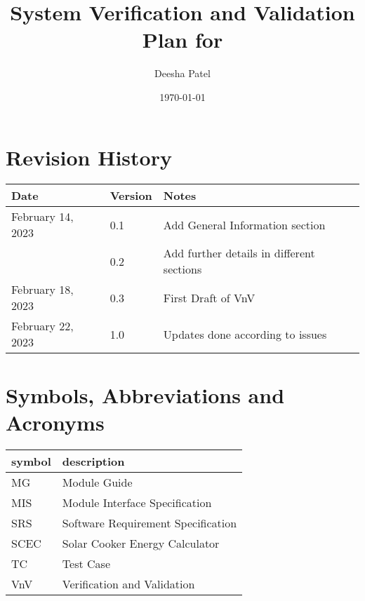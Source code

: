 \documentclass[12pt, titlepage]{article}
\begin{document}
\title{System Verification and Validation Plan for } 
\author{Deesha Patel}
\date{\today}
	
\maketitle


\section{Revision History}

\begin{tabularx}{\textwidth}{p{5cm}p{1.5cm}X}
\toprule {\bf Date} & {\bf Version} & {\bf Notes}\\
\midrule
February 14, 2023 & 0.1 & Add General Information section \\
& 0.2 & Add further details in different sections \\

February 18, 2023 & 0.3 & First Draft of VnV \\
February 22, 2023 & 1.0 & Updates done according to issues \\
\bottomrule
\end{tabularx}

\newpage

\tableofcontents

\listoftables


\newpage

\section{Symbols, Abbreviations and Acronyms}

\renewcommand{\arraystretch}{1.2}
\begin{tabular}{l l} 
  \toprule		
  \textbf{symbol} & \textbf{description}\\
  \midrule 
  MG & Module Guide \\
  MIS & Module Interface Specification \\
  SRS & Software Requirement Specification\\
  SCEC & Solar Cooker Energy Calculator \\ 
  TC & Test Case \\
  VnV & Verification and Validation \\ 
  
  \bottomrule
\end{tabular}\\
\end{document}
